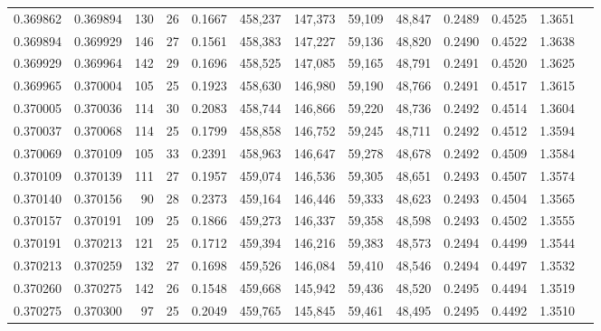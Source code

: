 \begin{tabular}{rrrrrrrrrrrrr}
0.369862 & 0.369894 &   130 &  26 &                                     0.1667 & 458,237 & 147,373 &  59,109 &  48,847 & 0.2489 & 0.4525 & 1.3651 \\
0.369894 & 0.369929 &   146 &  27 &                                     0.1561 & 458,383 & 147,227 &  59,136 &  48,820 & 0.2490 & 0.4522 & 1.3638 \\
0.369929 & 0.369964 &   142 &  29 &                                     0.1696 & 458,525 & 147,085 &  59,165 &  48,791 & 0.2491 & 0.4520 & 1.3625 \\
0.369965 & 0.370004 &   105 &  25 &                                     0.1923 & 458,630 & 146,980 &  59,190 &  48,766 & 0.2491 & 0.4517 & 1.3615 \\
0.370005 & 0.370036 &   114 &  30 &                                     0.2083 & 458,744 & 146,866 &  59,220 &  48,736 & 0.2492 & 0.4514 & 1.3604 \\
0.370037 & 0.370068 &   114 &  25 &                                     0.1799 & 458,858 & 146,752 &  59,245 &  48,711 & 0.2492 & 0.4512 & 1.3594 \\
0.370069 & 0.370109 &   105 &  33 &                                     0.2391 & 458,963 & 146,647 &  59,278 &  48,678 & 0.2492 & 0.4509 & 1.3584 \\
0.370109 & 0.370139 &   111 &  27 &                                     0.1957 & 459,074 & 146,536 &  59,305 &  48,651 & 0.2493 & 0.4507 & 1.3574 \\
0.370140 & 0.370156 &    90 &  28 &                                     0.2373 & 459,164 & 146,446 &  59,333 &  48,623 & 0.2493 & 0.4504 & 1.3565 \\
0.370157 & 0.370191 &   109 &  25 &                                     0.1866 & 459,273 & 146,337 &  59,358 &  48,598 & 0.2493 & 0.4502 & 1.3555 \\
0.370191 & 0.370213 &   121 &  25 &                                     0.1712 & 459,394 & 146,216 &  59,383 &  48,573 & 0.2494 & 0.4499 & 1.3544 \\
0.370213 & 0.370259 &   132 &  27 &                                     0.1698 & 459,526 & 146,084 &  59,410 &  48,546 & 0.2494 & 0.4497 & 1.3532 \\
0.370260 & 0.370275 &   142 &  26 &                                     0.1548 & 459,668 & 145,942 &  59,436 &  48,520 & 0.2495 & 0.4494 & 1.3519 \\
0.370275 & 0.370300 &    97 &  25 &                                     0.2049 & 459,765 & 145,845 &  59,461 &  48,495 & 0.2495 & 0.4492 & 1.3510 \\

\end{tabular}
